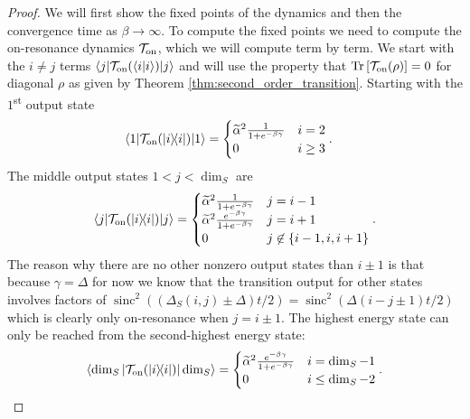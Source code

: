 \documentclass{article}
\newcommand{\on}{\rm on}
\newcommand{\ket}[1]{|#1\rangle}
\newcommand{\bra}[1]{\langle #1|}
\newcommand{\braket}[2]{\langle #1|#2\rangle}
\newcommand{\ketbra}[2]{| #1\rangle\! \langle #2|}
\newcommand{\brackets}[1]{\left[ #1 \right]}
\newcommand{\set}[1]{\left\{ #1 \right\}}
\newcommand{\ts}{\textsuperscript}
\DeclareMathOperator{\Tr}{Tr}
\newcommand{\trace}[1]{\Tr \brackets{ #1 }}
\DeclareMathOperator{\sinc}{sinc}
\begin{document}
\begin{proof}
    We will first show the fixed points of the dynamics and then the convergence time as $\beta \to \infty$. To compute the fixed points we need to compute the on-resonance dynamics $\mathcal{T}_{\on}$, which we will compute term by term. We start with the $i \neq j$ terms $\bra{j} \mathcal{T}_{\on}(\braket{i}{i}) \ket{j}$ and will use the property that $\trace{\mathcal{T}_{\on}(\rho)} = 0$ for diagonal $\rho$ as given by Theorem \ref{thm:second_order_transition}. 
    Starting with the $1$\ts{st} output state
\begin{align}
    \bra{1} \mathcal{T}_{\on}(\ketbra{i}{i}) \ket{1} &= \begin{cases}
        \widetilde{\alpha}^2 \frac{1}{1 + e^{-\beta \gamma}} & i = 2 \\
        0 & i \ge 3
    \end{cases}.
\end{align}
The middle output states $1 < j < \dim_S$ are 
\begin{equation}
    \bra{j} \mathcal{T}_{\on}(\ketbra{i}{i}) \ket{j} = \begin{cases}
        \widetilde{\alpha}^2 \frac{1}{1 + e^{-\beta \gamma}} & j = i - 1 \\
        \widetilde{\alpha}^2 \frac{e^{-\beta \gamma}}{1 + e^{-\beta \gamma}} & j = i + 1 \\
        0 & j \not\in \set{i - 1, i, i + 1}
    \end{cases}. \label{eq:sho_output_middle_states}
\end{equation}
The reason why there are no other nonzero output states than $i \pm 1$ is that because $\gamma = \Delta$ for now we know that the transition output for other states involves factors of $\sinc^2((\Delta_S(i, j) \pm \Delta)t/2) = \sinc^2(\Delta(i - j \pm 1) t/ 2)$ which is clearly only on-resonance when $j = i \pm 1$. The highest energy state can only be reached from the second-highest energy state:
\begin{equation}
    \bra{\dim_S} \mathcal{T}_{\on}(\ketbra{i}{i}) \ket{\dim_S} = \begin{cases}
        \widetilde{\alpha}^2 \frac{e^{-\beta \gamma}}{1 + e^{-\beta \gamma}} & i = \dim_S - 1 \\
        0 & i \le \dim_S - 2
    \end{cases}. \label{eq:sho_output_last_state}
\end{equation}


\end{proof}
\end{document}
